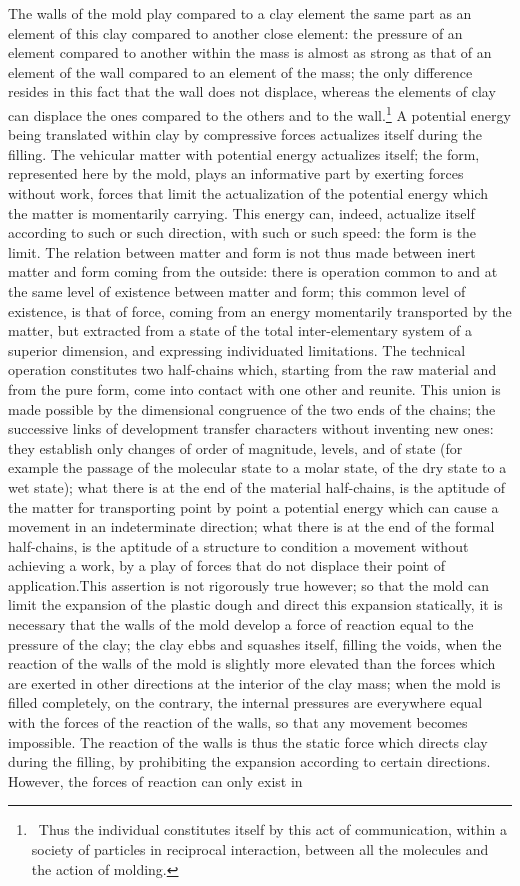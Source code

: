 \documentclass[a4paper]{article}
\begin{document}
The walls of the mold play compared to a clay element the same part as an element of this clay compared to another close element: the pressure of an element compared to another within the mass is almost as strong as that of an element of the wall compared to an element of the mass; the only difference resides in this fact that the wall does not displace, whereas the elements of clay can displace the ones compared to the others and to the wall.\footnote{\ Thus the individual constitutes itself by this act of communication, within a society of particles in reciprocal interaction, between all the molecules and the action of molding.} A potential energy being translated within clay by compressive forces actualizes itself during the filling. The vehicular matter with potential energy actualizes itself; the form, represented here by the mold, plays an informative part by exerting forces without work, forces that limit the actualization of the potential energy which the matter is momentarily carrying. This energy can, indeed, actualize itself according to such or such direction, with such or such speed: the form is the limit. The relation between matter and form is not thus made between inert matter and form coming from the outside: there is operation common to and at the same level of existence between matter and form; this common level of existence, is that of force, coming from an energy momentarily transported by the matter, but extracted from a state of the total inter-elementary system of a superior dimension, and expressing individuated limitations. The technical operation constitutes two half-chains which, starting from the raw material and from the pure form, come into contact with one other and reunite. This union is made possible by the dimensional congruence of the two ends of the chains; the successive links of development transfer characters without inventing new ones: they establish only changes of order of magnitude, levels, and of state (for example the passage of the molecular state to a molar state, of the dry state to a wet state); what there is at the end of the material half-chains, is the aptitude of the matter for transporting point by point a potential energy which can cause a movement in an indeterminate direction; what there is at the end of the formal half-chains, is the aptitude of a structure to condition a movement without achieving a work, by a play of forces that do not displace their point of application.This assertion is not rigorously true however; so that the mold can limit the expansion of the plastic dough and direct this expansion statically, it is necessary that the walls of the mold develop a force of reaction equal to the pressure of the clay; the clay ebbs and squashes itself, filling the voids, when the reaction of the walls of the mold is slightly more elevated than the forces which are exerted in other directions at the interior of the clay mass; when the mold is filled completely, on the contrary, the internal pressures are everywhere equal with the forces of the reaction of the walls, so that any movement becomes impossible. The reaction of the walls is thus the static force which directs clay during the filling, by prohibiting the expansion according to certain directions. However, the forces of reaction can only exist in 
\end{document}
